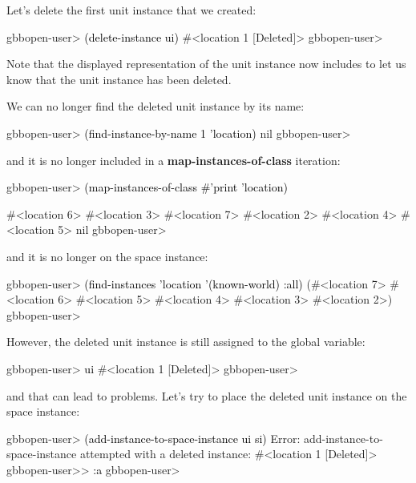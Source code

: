 \documentclass[10pt,twoside,english,pdftex]{article}
\begin{document}
%
%
Let's delete the first  unit instance that we created:
%
\W\supp
\begin{example}
\textcolor{darkergray}{%
  gbbopen-user> \textcolor{black}{(delete-instance ui)}
  #<location 1 [Deleted]>
  gbbopen-user>}
\end{example}
%
Note that the displayed representation of the unit instance now includes
\code{[Deleted]} to let us know that the unit instance has been deleted.

%
%
%
%
We can no longer find the deleted unit instance by its name:
%
\W\supp
\begin{example}
\textcolor{darkergray}{%
  gbbopen-user> \textcolor{black}{(find-instance-by-name 1 'location)}
  nil
  gbbopen-user>}
\end{example}
%
and it is no longer included in a \textbf{map-instances-of-class} iteration:
%
\W\supp\notpretop
\begin{example}
\textcolor{darkergray}{%
  gbbopen-user> \textcolor{black}{(map-instances-of-class #'print 'location)}

  #<location 6> 
  #<location 3> 
  #<location 7> 
  #<location 2> 
  #<location 4> 
  #<location 5> 
  nil
  gbbopen-user>}
\end{example}
%
and it is no longer on the  space instance:
%
\W\supp\notpretop
\begin{example}
\textcolor{darkergray}{%
  gbbopen-user> \textcolor{black}{(find-instances 'location '(known-world) :all)}
  (#<location 7> #<location 6> #<location 5> #<location 4> #<location 3>
   #<location 2>)
  gbbopen-user>}
\end{example}

%
However, the deleted  unit instance is still assigned to the
 global variable:
%
\W\supp
\begin{example}
\textcolor{darkergray}{%
  gbbopen-user> \textcolor{black}{ui}
  #<location 1 [Deleted]>
  gbbopen-user>}
\end{example}
%
and that can lead to problems.  Let's try to place the deleted 
unit instance on the  space instance:
%
\W\supp\notpretop
\begin{example}
\textcolor{darkergray}{%
  gbbopen-user> \textcolor{black}{(add-instance-to-space-instance ui si)}
  Error: add-instance-to-space-instance attempted with a deleted instance:
         #<location 1 [Deleted]>
  gbbopen-user>> \textcolor{black}{:a}
  gbbopen-user>}
\end{example}
\end{document}
